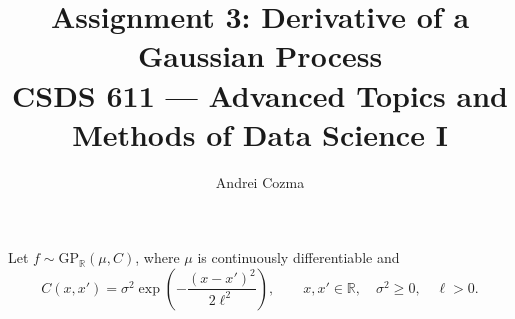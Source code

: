 \documentclass[11pt,letterpaper]{article}
\title{%
  Assignment 3: Derivative of a Gaussian Process\\[0.25em]
  {\normalsize\normalfont CSDS 611 --- Advanced Topics and Methods of Data Science I}%
}
\author{Andrei Cozma}
\date{}
\begin{document}
\maketitle

Let $f\sim\mathrm{GP}_{\mathbb R}(\mu,C)$, where $\mu$ is continuously
differentiable and
\[
  C(x,x')=\sigma^2\exp\!\left(-\frac{(x-x')^2}{2\ell^2}\right),
  \qquad x,x'\in\mathbb R,\quad \sigma^2\geq0,\quad\ell>0.
\]
\end{document}

